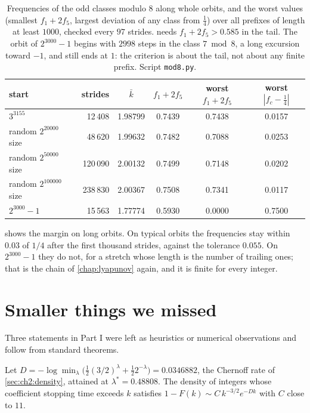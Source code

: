 \begin{table}[t]
\centering
\small
\setlength{\tabcolsep}{4pt}
\begin{tabular}{lrcccc}
\toprule
start & strides & $\bar k$ & $f_1+2f_5$ & worst $f_1+2f_5$ & worst $|f_c-\frac14|$\\
\midrule
$3^{3155}$ & 12\,408 & 1.98799 & 0.7439 & 0.7438 & 0.0157\\
random $2^{20000}$ size & 48\,620 & 1.99632 & 0.7482 & 0.7088 & 0.0253\\
random $2^{50000}$ size & 120\,090 & 2.00132 & 0.7499 & 0.7148 & 0.0202\\
random $2^{100000}$ size & 238\,830 & 2.00367 & 0.7508 & 0.7341 & 0.0117\\
$2^{3000}-1$ & 15\,563 & 1.77774 & 0.5930 & 0.0000 & 0.7500\\
\bottomrule
\end{tabular}
\caption{Frequencies of the odd classes modulo $8$ along whole orbits, and the worst values (smallest $f_1+2f_5$, largest deviation of any class from $\frac14$) over all prefixes of length at least $1000$, checked every $97$ strides.  needs $f_1+2f_5>0.585$ in the tail. The orbit of $2^{3000}-1$ begins with $2998$ steps in the class $7\bmod8$, a long excursion toward $-1$, and still ends at $1$: the criterion is about the tail, not about any finite prefix. Script \texttt{mod8.py}.}
\label{tab:ch20:mod8}
\end{table}

 shows the margin on long orbits. On typical orbits the frequencies stay within $0.03$ of $1/4$ after the first thousand strides, against the tolerance $0.055$. On $2^{3000}-1$ they do not, for a stretch whose length is the number of trailing ones; that is the chain of \cref{chap:lyapunov} again, and it is finite for every integer.

\section{Smaller things we missed}\label{sec:ch20:small}

Three statements in Part I were left as heuristics or numerical observations and follow from standard theorems.

\begin{proposition}[Persistence]\label{prop:ch20:persist}
Let $D=-\log\min_\lambda\bigl(\tfrac12(3/2)^\lambda+\tfrac122^{-\lambda}\bigr)=0.0346882$, the Chernoff rate of \cref{sec:ch2:density}, attained at $\lambda^\ast=0.48808$. The density of integers whose coefficient stopping time exceeds $k$ satisfies $1-F(k)\sim C\,k^{-3/2}e^{-Dk}$ with $C$ close to $11$.
\end{proposition}

